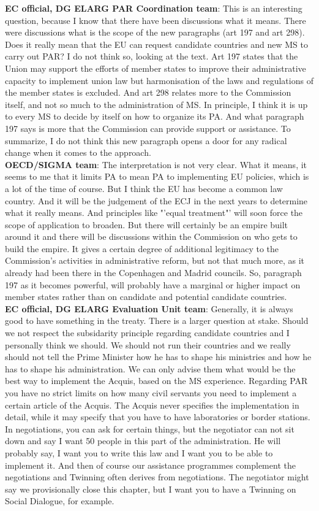 \textbf{EC official, DG ELARG PAR Coordination team}: This is an interesting question, because I know that there have been discussions what it means. There were discussions what is the scope of the new paragraphs (art 197 and art 298). Does it really mean that the EU can request candidate countries and new MS to carry out PAR? I do not think so, looking at the text. Art 197 states that the Union may support the efforts of member states to improve their administrative capacity to implement union law but harmonisation of the laws and regulations of the member states is excluded. And art 298 relates more to the Commission itself, and not so much to the administration of MS. In principle, I think it is up to every MS to decide by itself on how to organize its PA. And what paragraph 197 says is more that the Commission can provide support or assistance. To summarize, I do not think this new paragraph opens a door for any radical change when it comes to the approach. \\
\textbf{OECD/SIGMA team}: The interpretation is not very clear. What it means, it seems to me that it limits PA to mean PA to implementing EU policies, which is a lot of the time of course. But I think the EU has become a common law country. And it will be the judgement of the ECJ in the next years to determine what it really means. And principles like "'equal treatment"' will soon force the scope of application to broaden. But there will certainly be an empire built around it and there will be discussions within the Commission on who gets to build the empire. It gives a certain degree of additional legitimacy to the Commission's activities in administrative reform, but not that much more, as it already had been there in the Copenhagen and Madrid councils. So, paragraph 197 as it becomes powerful, will probably have a marginal or higher impact on member states rather than on candidate and potential candidate countries.\\
\textbf{EC official, DG ELARG Evaluation Unit team}: Generally, it is always good to have something in the treaty. There is a larger question at stake. Should we not respect the subsidarity principle regarding candidate countries and I personally think we should. We should not run their countries and we really should not tell the Prime Minister how he has to shape his ministries and how he has to shape his administration. We can only advise them what would be the best way to implement the Acquis, based on the MS experience. Regarding PAR you have no strict limits on how many civil servants you need to implement a certain article of the Acquis. The Acquis never specifies the implementation in detail, while it may specify that you have to have laboratories or border stations. In negotiations, you can ask for certain things, but the negotiator can not sit down and say I want 50 people in this part of the administration. He will probably say, I want you to write this law and I want you to be able to implement it. And then of course our assistance programmes complement the negotiations and Twinning often derives from negotiations. The negotiator might say we provisionally close this chapter, but I want you to have a Twinning on Social Dialogue, for example.\\
